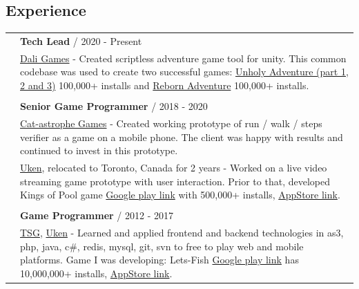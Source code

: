 \documentclass[12pt,a4paper]{article}
\begin{document}
\begin{multicols}{2}

\section*{Experience }

	\begin{tabular}{ >{\RaggedLeft}p{0cm}   p{8.5cm}  } 
 
		&  \textbf{Tech Lead} / 2020 - Present \\
		&  \hspace{5mm}  {\href{https://dali.games/}{Dali Games}} - Created scriptless adventure game tool for unity. This common codebase was used to create two successful games: {\href{https://play.google.com/store/apps/details?id=games.dali.adventure.neighborhood.unholy}{Unholy Adventure (part 1, 2 and 3)}} 100,000+ installs and {\href{https://play.google.com/store/apps/details?id=games.dali.adventure.reborn}{Reborn Adventure}} 100,000+ installs.   \\

		& \\

		 & \textbf{Senior Game Programmer} / 2018 - 2020  \\
		& \hspace{5mm} {\href{https://cat-astrophe-games.com/}{Cat-astrophe Games}} - Created working prototype of run / walk / steps verifier as a game on a mobile phone. The client was happy with results and continued to invest in this prototype.  \\

		& \hspace{5mm} {\href{https://www.uken.com/}{Uken}}, relocated to Toronto, Canada for 2 years - Worked on a live video streaming game prototype with user interaction. Prior to that, developed Kings of Pool game {\href{https://play.google.com/store/apps/details?id=com.uken.pool}{Google play link}} with  500,000+ installs, {\href{https://itunes.apple.com/us/app/kings-of-pool/id1049420215}{AppStore link}}.  \\

		& \\
		&  \textbf{Game Programmer} / 2012 - 2017 \\ 
		& \hspace{5mm} {\href{https://tensquaregames.com/}{TSG}}, {\href{https://www.uken.com/}{Uken}} - Learned and applied frontend and backend technologies in as3, php, java, c\#, redis, mysql, git, svn to free to play web and mobile platforms. Game I was developing: Lets-Fish {\href{https://play.google.com/store/apps/details?id=air.com.tensquaregames.letsfish}{Google play link}} has 10,000,000+ installs, {\href{https://itunes.apple.com/pl/app/lets-fish-sport-fishing-games-bass-simulator/id768152194}{AppStore link}}.    \\	 


\end{tabular}
\end{multicols}
\end{document}
